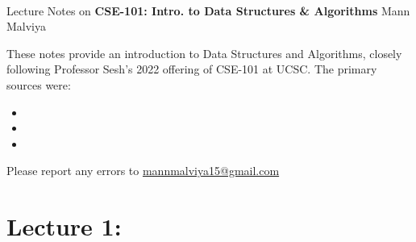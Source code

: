\documentclass[11pt]{article}
\begin{document}
\thispagestyle{empty}
\bigskip \
\vspace{0.1cm}

\begin{center}
{\fontsize{22}{22} \selectfont Lecture Notes on}
\vskip 16pt
{\fontsize{20}{20} \selectfont \bf \sffamily CSE-101: Intro. to Data Structures \& Algorithms}
\vskip 24pt
{\fontsize{18}{18} \selectfont \rmfamily Mann Malviya} 
\vskip 6pt
{\fontsize{14}{14} \selectfont {}} 
\vskip 24pt
\end{center}

{\parindent0pt \baselineskip=15.5pt These notes provide an introduction to Data Structures and Algorithms, closely following Professor Sesh's 2022 offering of CSE-101 at UCSC. The primary sources were:

\begin{itemize}
    \item 
    \item 
    \item 
\end{itemize}

Please report any errors to \href{mailto:mannmalviya15@gmail.com}{mannmalviya15@gmail.com}


}

\newpage
\tableofcontents  
\newpage

\section*{Lecture 1:}
\end{document}
